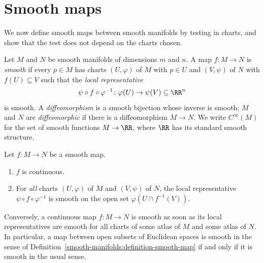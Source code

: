 \section{Smooth maps}\label{smooth-manifolds:section-smooth-maps}

We now define smooth maps between smooth manifolds by testing in charts, and show that the test does not depend on the charts chosen.

\begin{definition}\label{smooth-manifolds:definition-smooth-map}
Let $M$ and $N$ be smooth manifolds of dimensions $m$ and $n$. A map $f \colon M \to N$ is \emph{smooth} if every $p \in M$ has charts $(U, \varphi)$ of $M$ with
$p \in U$ and $(V, \psi)$ of $N$ with $f(U) \subseteq V$ such that the \emph{local representative}
\[
\psi \circ f \circ \varphi^{-1} \colon \varphi(U) \to \psi(V) \subseteq \RR^n
\]
is smooth. A \emph{diffeomorphism} is a smooth bijection whose inverse is smooth; $M$ and $N$ are \emph{diffeomorphic} if there is a diffeomorphism
$M \to N$. We write $C^\infty(M)$ for the set of smooth functions $M \to \RR$, where $\RR$ has its standard smooth structure.
\end{definition}

\begin{lemma}\label{smooth-manifolds:lemma-smooth-independent}
Let $f \colon M \to N$ be a smooth map.
\begin{enumerate}
\item $f$ is continuous.
\item For \emph{all} charts $(U, \varphi)$ of $M$ and $(V, \psi)$ of $N$, the local representative $\psi \circ f \circ \varphi^{-1}$ is smooth on the open set
$\varphi(U \cap f^{-1}(V))$.
\end{enumerate}
Conversely, a continuous map $f \colon M \to N$ is smooth as soon as its local representatives are smooth for all charts of some atlas of $M$ and some atlas of
$N$. In particular, a map between open subsets of Euclidean spaces is smooth in the sense of Definition~\ref{smooth-manifolds:definition-smooth-map} if and only
if it is smooth in the usual sense.
\end{lemma}


